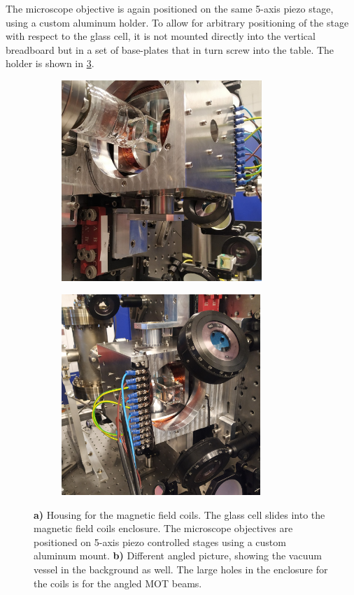The microscope objective is again positioned on the same 5-axis piezo stage, using a custom aluminum holder.
To allow for arbitrary positioning of the stage with respect to the glass cell, it is not mounted directly into the vertical breadboard but in a set of base-plates that in turn screw into the table.
The holder is shown in \cref{fig:Coils}.
\begin{figure}
	\begin{subfigure}{.49\linewidth}
		\flushleft
		\includegraphics[height=7.6cm]{figures/CoilsCropped.jpg}
		\caption{}
		\label{fig:Coils1}
	\end{subfigure}
	\hfill
	\begin{subfigure}{.49\linewidth}
		\flushright
		\includegraphics[height=7.6cm]{figures/CoilsCropped2.jpg}
		\caption{}
		\label{fig:Coils2}
	\end{subfigure}
	\caption{
	\textsf{\textbf{a)}} Housing for the magnetic field coils. 
	The glass cell slides into the magnetic field coils enclosure.
    The microscope objectives are positioned on 5-axis piezo controlled stages using a custom aluminum mount. 
    \textsf{\textbf{b)}} Different angled picture, showing the vacuum vessel in the background as well. 
    The large holes in the enclosure for the coils is for the angled MOT beams.
    }
    \label{fig:Coils}
\end{figure}
